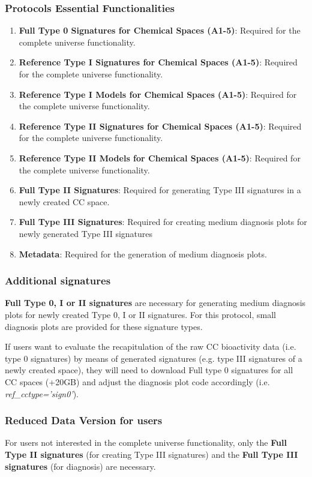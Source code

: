 \subsubsection{Protocols Essential Functionalities}
\begin{enumerate}
    \item \textbf{Full Type 0 Signatures for Chemical Spaces (A1-5)}: Required for the complete universe functionality. 
    \item \textbf{Reference Type I Signatures for Chemical Spaces (A1-5)}: Required for the complete universe functionality.
    \item \textbf{Reference Type I Models for Chemical Spaces (A1-5)}: Required for the complete universe functionality.
    \item \textbf{Reference Type II Signatures for Chemical Spaces (A1-5)}: Required for the complete universe functionality.
    \item \textbf{Reference Type II Models for Chemical Spaces (A1-5)}: Required for the complete universe functionality.
    \item \textbf{Full Type II Signatures}: Required for generating Type III signatures in a newly created CC space.
    \item \textbf{Full Type III Signatures}: Required for creating medium diagnosis plots for newly generated Type III signatures
    \item \textbf{Metadata}: Required for the generation of medium diagnosis plots.
    
\end{enumerate}

\subsubsection{Additional signatures}

\textbf{Full Type 0, I or II signatures} are necessary for generating medium diagnosis plots for newly created Type 0, I or II signatures. For this protocol, small diagnosis plots are provided for these signature types. 

If users want to evaluate the recapitulation of the raw CC bioactivity data (i.e. type 0 signatures) by means of generated signatures (e.g. type III signatures of a newly created space), they will need to download Full type 0 signatures for all CC spaces (+20GB) and adjust the diagnosis plot code accordingly (i.e. \textit{ref\_cctype=’sign0’}).

\subsubsection{Reduced Data Version for users}

For users not interested in the complete universe functionality, only the \textbf{Full Type II signatures} (for creating Type III signatures) and the \textbf{Full Type III signatures }(for diagnosis) are necessary. 

